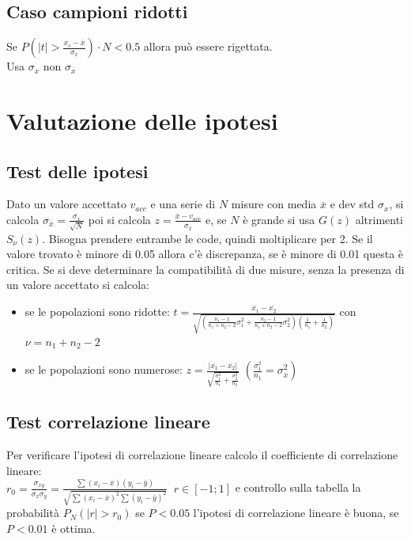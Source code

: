 \documentclass[11pt]{article}
\begin{document}
    \subsection{Caso campioni ridotti}
    Se $ P \left( |t| > \frac{x_s - \overline{x}}{\sigma_x} \right) \cdot N < 0.5 $ allora può essere rigettata. \\
    Usa $ \sigma_x $ non $\sigma_{\overline{x}}$


    \section{Valutazione delle ipotesi}

    \subsection{Test delle ipotesi}
    Dato un valore accettato $v_{acc}$ e una serie di $N$ misure con media $\overline{x}$ e dev std $ \sigma_x $,
    si calcola $ \sigma_{\overline{x}} = \frac{\sigma_x}{\sqrt{N}} $ poi si calcola
    $ z = \frac{\overline{x} - v_{acc}}{\sigma_{\overline{x}}} $ e, se $N$ è grande si usa $G(z)$ altrimenti $S_\nu(z)$. \hfill \break
    Bisogna prendere entrambe le code, quindi moltiplicare per 2.
    Se il valore trovato è minore di 0.05 allora c'è discrepanza, se è minore di 0.01 questa è critica. \hfill \break
    Se si deve determinare la compatibilità di due misure, senza la presenza di un valore accettato si calcola:
    \begin{itemize}
        \item se le popolazioni sono ridotte:
        $ t = \frac{\overline{x_1} - \overline{x_2}}{\sqrt{\left( \frac{n_1 - 1}{n_1 + n_2 - 2}\sigma_1^2 +
        \frac{n_2 - 1}{n_1 + n_2 - 2}\sigma_2^2 \right) \left( \frac{1}{n_1} + \frac{1}{n_2} \right)}} $ con $ \nu = n_1 + n_2 - 2 $
        \item se le popolazioni sono numerose:
        $ z = \frac{|\overline{x_1} - \overline{x_2}|}{\sqrt{\frac{\sigma_1^2}{n_1} + \frac{\sigma_2^2}{n_2}}} $
        $\left( \frac{\sigma_1^2}{n_1} = \sigma_{\overline{x}}^2 \right) $
    \end{itemize}

    \subsection{Test correlazione lineare}

    Per verificare l'ipotesi di correlazione lineare calcolo il coefficiente di correlazione lineare: \\[.3\baselineskip]
    $ r_0 = \frac{\sigma_{xy}}{\sigma_x \sigma_y} =
    \frac{\sum (x_i - \bar{x})(y_i - \bar{y})}{\sqrt {\sum (x_i  - \bar{x})^2 \sum (y_i - \bar{y})^2}} \; \; r \in [-1 ; 1] $
    e controllo sulla tabella la probabilità $ P_N(|r| > r_0) $ se $ P < 0.05 $ l'ipotesi di correlazione lineare è buona,
    se $P < 0.01 $ è ottima.
\end{document}
